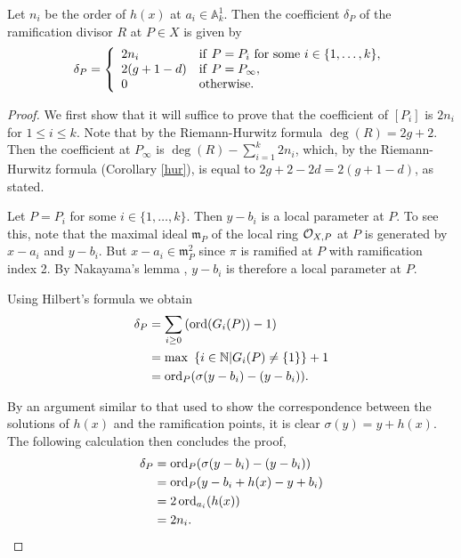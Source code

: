 \begin{lem}\label{char2ramification}
Let $n_i$ be the order of $h(x)$ at $a_i\in \mathbb A_k^1$.
Then the coefficient $\delta_P$ of the ramification divisor $R$ at $P\in X$ is given by
\[
\delta_P = \left\{
\begin{array}{ll}
2n_i & {\rm if }\ P=P_i\ {\rm for\ some }\ i \in \{1,\ldots ,k\}, \\
2(g+1-d) & {\rm if }\  P=P_\infty, \\
0 & {\rm otherwise.} 
\end{array}
\right.
\]
\end{lem}
\begin{proof}
We first show that it will suffice to prove that the coefficient of $[P_i]$ is $2n_i$ for $1\leq i \leq k$.
Note that by the Riemann-Hurwitz formula $\deg(R) = 2g+2$.
Then the coefficient at $P_\infty$ is $\deg(R) - \sum_{i=1}^k2n_i$, which, by the Riemann-Hurwitz formula (Corollary \ref{hur}), is equal to $2g+2-2d = 2(g+1-d)$, as stated.

Let $P=P_i$ for some $i\in \{1,\ldots , k\}$.
Then $y-b_i$ is a local parameter at $P$.
To see this, note that the maximal ideal $\mathfrak m_{P}$ of the local ring ${\cal O}_{X,P}$ at $P$ is generated by $x-a_i$ and $y-b_i$.
But $x-a_i\in \mathfrak m_{P}^2$ since $\pi$ is ramified at $P$ with ramification index 2.
By Nakayama's lemma \cite[Prop. 2.6]{atiyahmacdonald}, $y-b_i$ is therefore a local parameter at $P$.

Using Hilbert's formula \cite[Chap. IV, \S 1, Prop. 4]{localfields} we obtain
\begin{align*}
\delta_P & =  \sum_{i\geq 0} \left(\operatorname{ord}(G_i(P))-1\right) \\
& =  {\rm max\ }\left\{ i\in {\mathbb N} | G_i(P)\neq \{1\}\right\} + 1 \\
& =  \operatorname{ord}_{P}(\sigma(y-b_i) - (y-b_i)).
\end{align*}

By an argument similar to that used to show the correspondence between the solutions of $h(x)$ and the ramification points, it is clear $\sigma(y)=y+h(x)$.
The following calculation then concludes the proof,
\begin{align*}
\delta_P & =  \operatorname{ord}_{P}(\sigma(y-b_i) - (y-b_i)) \\
& =  \operatorname{ord}_{P}(y-b_i+h(x) - y + b_i) \\
& =  2\operatorname{ord}_{a_i}(h(x)) \\
& =  2n_i.
\end{align*}
\end{proof}



